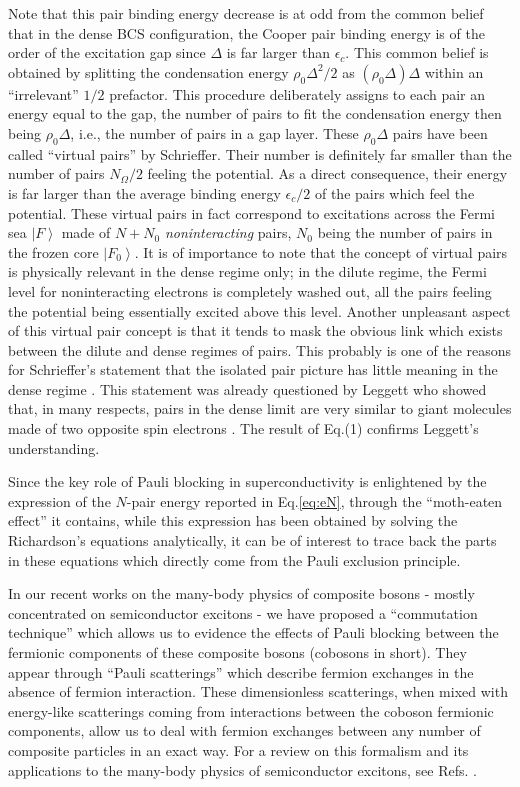 \documentclass[aps,prb,superscriptaddress,showpacs,reprint,lengthcheck]{revtex4-1}
\begin{document}
Note that this pair binding energy decrease is at odd from
the common belief that in the dense BCS configuration, the Cooper pair
binding energy is of the order of the excitation gap since  $\Delta $ is far larger
than $\epsilon _{c}$. This common belief is obtained by splitting the
condensation energy $\rho _{0}\Delta ^{2}/2$ as $(\rho _{0}\Delta )\Delta $
within an ``irrelevant'' $1/2$ prefactor. This procedure deliberately assigns to each pair an
energy equal to the gap, the number of pairs to fit the condensation energy
then being $\rho _{0}\Delta $, i.e., the number of pairs in a gap layer. These $\rho
_{0}\Delta $ pairs have been called ``virtual pairs'' by Schrieffer.
Their number is definitely far smaller than the number of pairs $N_{\Omega }/2$ feeling
the potential. As a direct consequence, their energy is far larger than the average binding energy $%
\epsilon _{c}/2$ of the pairs which feel the potential. These virtual pairs in fact correspond
to excitations across the Fermi sea $\left\vert F\right\rangle $ made of $%
N+N_{0}$ \textit{noninteracting} pairs, $N_{0}$ being the number of pairs in
the frozen core $\left\vert F_{0}\right\rangle $. It is of importance to note that the concept of virtual
pairs is physically relevant in the dense regime only; in the
dilute regime, the Fermi level for noninteracting electrons is completely
washed out, all the pairs feeling the potential being essentially excited above this level.
Another unpleasant aspect of this virtual pair concept is that it tends to 
mask the obvious link which exists between the dilute and dense regimes of pairs. 
This probably is one of the reasons for Schrieffer's statement that the
isolated pair picture has little meaning in the dense regime
\cite{Schrieffer}. This statement was already questioned by Leggett who
showed that, in many respects, pairs in the dense limit are very similar to giant molecules made of two opposite spin electrons \cite{LeggettCrossover}. The result of Eq.(1) confirms Leggett's understanding. 

Since the key role of Pauli blocking in superconductivity is enlightened by
the expression of the $N$-pair energy reported in Eq.\eqref{eq:eN}, through the ``moth-eaten effect'' it contains, 
while this expression has been obtained by solving the
Richardson's equations analytically, it can be of interest to trace back the parts in
these equations which directly come from the Pauli exclusion principle.

In our recent works on the many-body physics of composite bosons - mostly concentrated on semiconductor excitons - we have
proposed a ``commutation technique'' which allows us to evidence the effects
of Pauli blocking between the fermionic components of these composite
bosons (cobosons in short). They appear through ``Pauli scatterings'' which describe fermion
exchanges in the absence of fermion interaction. These dimensionless
scatterings, when mixed with energy-like scatterings coming from interactions
between the coboson fermionic components, allow us to deal with fermion exchanges
between any number of composite particles in an exact way. For a review on
this formalism and its applications to the many-body physics of
semiconductor excitons, see Refs. \cite%
{CobosonPhysicsReports}.
\end{document}
